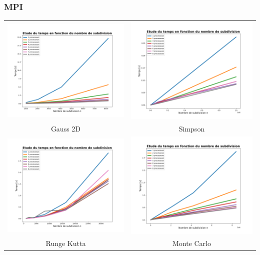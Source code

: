 \documentclass[10pt]{beamer}
\begin{document}
\begin{frame}
    \frametitle{MPI}
        \small
    \begin{tabular}{cc}
        \includegraphics[width=0.45\linewidth]{../Images/time_gauss_MPI.png} &
        \includegraphics[width=0.45\linewidth]{../Images/time_simp_MPI.png} \\
        Gauss 2D & Simpson \\
        \includegraphics[width=0.45\linewidth]{../Images/time_RK_MPI.png} &
        \includegraphics[width=0.45\linewidth]{../Images/time_montecarlo_MPI.png} \\
        Runge Kutta & Monte Carlo \\
    \end{tabular}
        
\end{frame}
\end{document}
